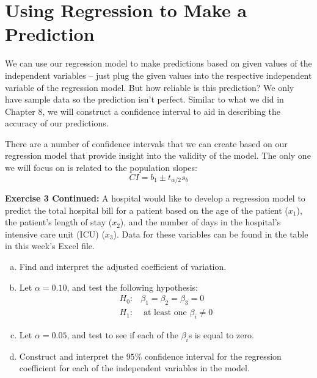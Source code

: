 \documentclass[12pt, letterpaper]{article}
\theoremstyle{definition}
\begin{document}
\newpage

\section*{Using Regression to Make a Prediction}

We can use our regression model to make predictions based on given values of the independent variables -- just plug the given values into the respective independent variable of the regression model.  But how reliable is this prediction?  We only have sample data so the prediction isn't perfect.  Similar to what we did in Chapter 8, we will construct a confidence interval to aid in describing the accuracy of our predictions.

There are a number of confidence intervals that we can create based on our regression model that provide insight into the validity of the model.  The only one we will focus on is related to the population slopes:
$$ CI=b_1\pm t_{\alpha/2}s_b $$

\bigskip

\begin{statement}
\noindent\textbf{Exercise 3 Continued:}
A hospital would like to develop a regression model to predict the total hospital bill for a patient based on the age of the patient ($x_1$), the patient's length of stay ($x_2$), and the number of days in the hospital's intensive care unit (ICU) ($x_3$).  Data for these variables can be found in the table in this week's Excel file.
\end{statement}


\begin{enumerate}[(a)]

\item  Find and interpret the adjusted coefficient of variation.

\item Let $\alpha=0.10$, and test the following hypothesis:
\begin{align*}
H_0:& \beta_1=\beta_2=\beta_3=0\\
H_1:&  \text{ at least one } \beta_i\neq 0
\end{align*} 

\item Let $\alpha=0.05$, and test to see if each of the $\beta_i$s is equal to zero.


\item Construct and interpret the $95\%$ confidence interval for the regression coefficient for each of the independent variables in the model. 

\end{enumerate}
\end{document}
